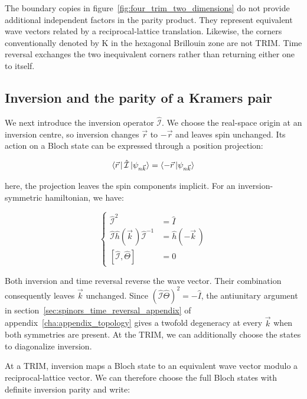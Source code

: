 The boundary copies in figure~\ref{fig:four_trim_two_dimensions} do not provide additional independent factors in the parity product.
They represent equivalent wave vectors related by a reciprocal-lattice translation.
Likewise, the corners conventionally denoted by $\mathrm{K}$ in the hexagonal Brillouin zone are not TRIM.
Time reversal exchanges the two inequivalent corners rather than returning either one to itself.

\subsection{Inversion and the parity of a Kramers pair}

We next introduce the inversion operator $\hat{\mathcal{I}}$.
We choose the real-space origin at an inversion centre,
so inversion changes $\vec{r}$ to $-\vec{r}$ and leaves spin unchanged.
Its action on a Bloch state can be expressed through a position projection:

\begin{equation}
    \bra{\vec{r}\,}\hat{\mathcal{I}}\ket{\psi_{n\vec{k}}}
    =\braket{-\vec{r}\,|\psi_{n\vec{k}}}
\label{inversion_position_projection_topology}
\end{equation}

here, the projection leaves the spin components implicit.
For an inversion-symmetric hamiltonian, we have:

\begin{equation}
\left\{\begin{aligned}
    \hat{\mathcal{I}}^2&=\hat{I} \\
    \hat{\mathcal{I}}\hat{h}(\vec{k}\,)\hat{\mathcal{I}}^{-1}
    &=\hat{h}(-\vec{k}\,) \\
    [\hat{\mathcal{I}},\hat{\Theta}]&=0
\end{aligned}\right.
\label{inversion_symmetry_relations_topology}
\end{equation}

Both inversion and time reversal reverse the wave vector.
Their combination consequently leaves $\vec{k}$ unchanged.
Since $(\hat{\mathcal{I}}\hat{\Theta})^2=-\hat{I}$,
the antiunitary argument in section~\ref{sec:spinors_time_reversal_appendix} of appendix~\ref{cha:appendix_topology}
gives a twofold degeneracy at every $\vec{k}$
when both symmetries are present.
At the TRIM, we can additionally choose the states to diagonalize inversion.

At a TRIM, inversion maps a Bloch state to an equivalent wave vector modulo a reciprocal-lattice vector.
We can therefore choose the full Bloch states with definite inversion parity and write:

